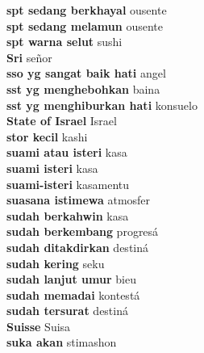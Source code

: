 \textbf{ spt sedang berkhayal  } ousente \\
\textbf{ spt sedang melamun  } ousente \\
\textbf{ spt warna selut  } sushi \\
\textbf{ Sri  } señor \\
\textbf{ sso yg sangat baik hati  } angel \\
\textbf{ sst yg menghebohkan  } baina \\
\textbf{ sst yg menghiburkan hati  } konsuelo \\
\textbf{ State of Israel  } Israel \\
\textbf{ stor kecil  } kashi \\
\textbf{ suami atau isteri  } kasa \\
\textbf{ suami isteri  } kasa \\
\textbf{ suami-isteri  } kasamentu \\
\textbf{ suasana istimewa  } atmosfer \\
\textbf{ sudah berkahwin  } kasa \\
\textbf{ sudah berkembang  } progresá \\
\textbf{ sudah ditakdirkan  } destiná \\
\textbf{ sudah kering  } seku \\
\textbf{ sudah lanjut umur  } bieu \\
\textbf{ sudah memadai  } kontestá \\
\textbf{ sudah tersurat  } destiná \\
\textbf{ Suisse  } Suisa \\
\textbf{ suka akan  } stimashon \\

